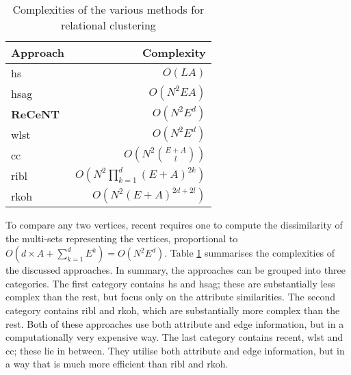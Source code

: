 \begin{table}
    \centering
    \caption{Complexities of the various methods for relational clustering}
    \label{tab:complexities}
    \begin{tabular}{@{}lr@{}}
        \toprule
        \textbf{Approach} & \textbf{Complexity} \\
        \midrule
        \gls{hs}    & $O\left (  LA \right )$       \\

         \gls{hsag}  & $O \left ( N^2EA \right)$     \\

        \textbf{ReCeNT}  & $O \left ( N^2  E^d  \right )$ \\

         \gls{wlst}  & $O \left( N^2 E^d \right ) $  \\

        \gls{cc}    & $O \left( N^2   {{E + A}\choose{l}} \right)$  \\

        \gls{ribl}  & $O \left(  N^2 \prod_{k=1}^{d}(E + A)^{2k} \right) $  \\

         \gls{rkoh}  & $O \left(  N^2 \left( E + A \right)^{2d + 2l} \right)$ \\
        \bottomrule
    \end{tabular}

\end{table}



To compare any two vertices, \gls{recent} requires one to compute the dissimilarity of the multi-sets representing the vertices, proportional to $O(d\times A + \sum_{k=1}^d E^k) = O\left (N^2 E^d \right )$.
Table \ref{tab:complexities} summarises the complexities of the discussed approaches.
In summary, the approaches can be grouped into three categories.
The first category contains \gls{hs} and \gls{hsag}; these are substantially less complex than the rest, but focus only on the attribute similarities.
The second category contains \gls{ribl} and \gls{rkoh}, which are substantially more complex than the rest.
Both of these approaches use both attribute and edge information, but in a computationally very expensive way.
The last category contains \gls{recent}, \gls{wlst} and \gls{cc}; these lie in between. They utilise both attribute and edge information, but in a way that is much more efficient than \gls{ribl} and \gls{rkoh}.





